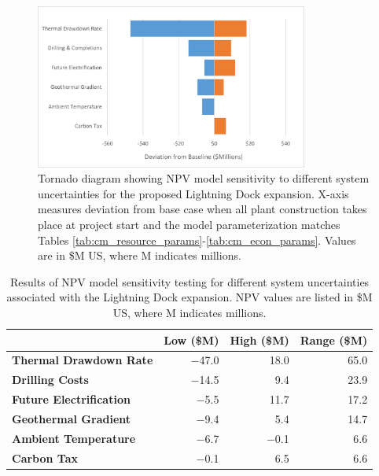 \begin{figure}
\centering
\includegraphics[width=0.8\textwidth]{templates/images/Figure-Tornado.png}
\singlespacing
\caption[Sensitivity testing tornado diagram]{Tornado diagram showing NPV model sensitivity to different system uncertainties for the proposed Lightning Dock expansion. X-axis measures deviation from base case when all plant construction takes place at project start and the model parameterization matches Tables \ref{tab:cm_resource_params}-\ref{tab:cm_econ_params}. Values are in \$M US, where M indicates millions.}
\label{fig:tornado}
\end{figure}

\begin{table}
\centering
\begin{tabular}{|l|r|r|r|}
\hline
\textbf{} & \textbf{Low (\$M)} & \textbf{High (\$M)} & \textbf{Range (\$M)} \\ \hline
\textbf{Thermal Drawdown Rate} & $\boldsymbol-$47.0 & 18.0 & 65.0 \\ \hline
\textbf{Drilling Costs} & $\boldsymbol-$14.5 & 9.4 & 23.9 \\ \hline
\textbf{Future Electrification} & $\boldsymbol-$5.5 & 11.7 & 17.2 \\ \hline
\textbf{Geothermal Gradient} & $\boldsymbol-$9.4 & 5.4 & 14.7 \\ \hline
\textbf{Ambient Temperature} & $\boldsymbol-$6.7 & $\boldsymbol-$0.1 & 6.6 \\ \hline
\textbf{Carbon Tax} & $\boldsymbol-$0.1 & 6.5 & 6.6 \\ \hline
\end{tabular}
\caption[Sensitivity testing results]{Results of NPV model sensitivity testing for different system uncertainties associated with the Lightning Dock expansion. NPV values are listed in \$M US, where M indicates millions.}
\label{tab:tornado_table}
\end{table}

